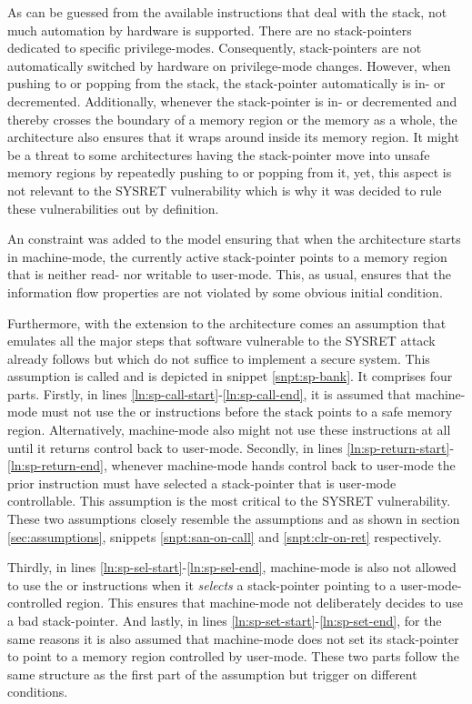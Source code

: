 As can be guessed from the available instructions that deal with the stack, not much automation by hardware is supported.
There are no stack-pointers dedicated to specific privilege-modes.
Consequently, stack-pointers are not automatically switched by hardware on privilege-mode changes.
However, when pushing to or popping from the stack, the stack-pointer automatically is in- or decremented.
Additionally, whenever the stack-pointer is in- or decremented and thereby crosses the boundary of a memory region or the memory as a whole, the architecture also ensures that it wraps around inside its memory region.
It might be a threat to some architectures having the stack-pointer move into unsafe memory regions by repeatedly pushing to or popping from it, yet, this aspect is not relevant to the SYSRET vulnerability which is why it was decided to rule these vulnerabilities out by definition.

An  constraint was added to the model ensuring that when the architecture starts in machine-mode, the currently active stack-pointer points to a memory region that is neither read- nor writable to user-mode.
This, as usual, ensures that the information flow properties are not violated by some obvious initial condition.

Furthermore, with the extension to the architecture comes an assumption that emulates all the major steps that software vulnerable to the SYSRET attack already follows but which do not suffice to implement a secure system.
This assumption is called  and is depicted in snippet \ref{snpt:sp-bank}.
It comprises four parts.
Firstly, in lines \ref{ln:sp-call-start}-\ref{ln:sp-call-end}, it is assumed that machine-mode must not use the  or  instructions before the stack points to a safe memory region.
Alternatively, machine-mode also might not use these instructions at all until it returns control back to user-mode.
Secondly, in lines \ref{ln:sp-return-start}-\ref{ln:sp-return-end}, whenever machine-mode hands control back to user-mode the prior instruction must have selected a stack-pointer that is user-mode controllable.
This assumption is the most critical to the SYSRET vulnerability.
These two assumptions closely resemble the assumptions  and  as shown in section \ref{sec:assumptions}, snippets \ref{snpt:san-on-call} and \ref{snpt:clr-on-ret} respectively.

Thirdly, in lines \ref{ln:sp-sel-start}-\ref{ln:sp-sel-end}, machine-mode is also not allowed to use the  or  instructions when it \textit{selects} a stack-pointer pointing to a user-mode-controlled region.
This ensures that machine-mode not deliberately decides to use a bad stack-pointer.
And lastly, in lines \ref{ln:sp-set-start}-\ref{ln:sp-set-end}, for the same reasons it is also assumed that machine-mode does not set its stack-pointer to point to a memory region controlled by user-mode.
These two parts follow the same structure as the first part of the  assumption but trigger on different conditions.

